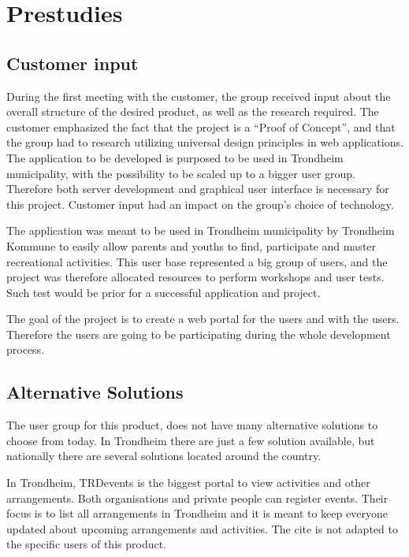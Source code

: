 
\chapter{Prestudies}


\section{Customer input}
During the first meeting with the customer, the group received input about the overall structure of the desired product, as well as the research required. The customer emphasized the fact that the project is a “Proof of Concept”, and that the group had to research utilizing universal design principles in web applications. The application to be developed is purposed to be used in Trondheim municipality, with the possibility to be scaled up to a bigger user group. Therefore both server development and graphical user interface is necessary for this project. Customer input had an impact on the group's choice of technology.

The application was meant to be used in Trondheim municipality by Trondheim Kommune to easily allow parents and youths to find, participate and master recreational activities. This user base represented a big group of users, and the project was therefore allocated resources to perform workshops and user tests. Such test would be prior for a successful application and project.

The goal of the project is to create a web portal for the users and with the users. Therefore the users are going to be participating during the whole development process.

\section{Alternative Solutions}
\label{alternativeSolutions}
The user group for this product, does not have many alternative solutions to choose from today. In Trondheim there are just a few solution available, but nationally there are several solutions located around the country. 

In Trondheim, TRDevents \cite{TRDevents} is the biggest portal to view activities and other arrangements. Both organisations and private people can register events. Their focus is to list all arrangements in Trondheim and it is meant to keep everyone updated about upcoming arrangements and activities. The cite is not adapted to the specific users of this product.

